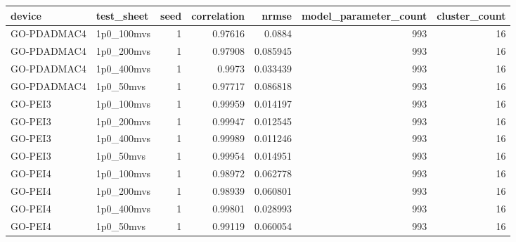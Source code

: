 \begin{tabular}{llrrrrr}
\toprule
device & test\_sheet & seed & correlation & nrmse & model\_parameter\_count & cluster\_count \\
\midrule
GO-PDADMAC4 & 1p0\_100mvs & 1 & 0.97616 & 0.0884 & 993 & 16 \\
GO-PDADMAC4 & 1p0\_200mvs & 1 & 0.97908 & 0.085945 & 993 & 16 \\
GO-PDADMAC4 & 1p0\_400mvs & 1 & 0.9973 & 0.033439 & 993 & 16 \\
GO-PDADMAC4 & 1p0\_50mvs & 1 & 0.97717 & 0.086818 & 993 & 16 \\
GO-PEI3 & 1p0\_100mvs & 1 & 0.99959 & 0.014197 & 993 & 16 \\
GO-PEI3 & 1p0\_200mvs & 1 & 0.99947 & 0.012545 & 993 & 16 \\
GO-PEI3 & 1p0\_400mvs & 1 & 0.99989 & 0.011246 & 993 & 16 \\
GO-PEI3 & 1p0\_50mvs & 1 & 0.99954 & 0.014951 & 993 & 16 \\
GO-PEI4 & 1p0\_100mvs & 1 & 0.98972 & 0.062778 & 993 & 16 \\
GO-PEI4 & 1p0\_200mvs & 1 & 0.98939 & 0.060801 & 993 & 16 \\
GO-PEI4 & 1p0\_400mvs & 1 & 0.99801 & 0.028993 & 993 & 16 \\
GO-PEI4 & 1p0\_50mvs & 1 & 0.99119 & 0.060054 & 993 & 16 \\
\bottomrule
\end{tabular}
